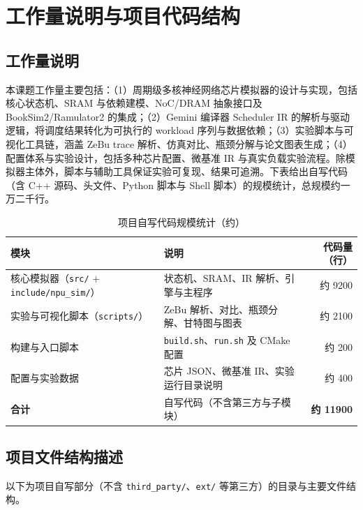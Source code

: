 \section{工作量说明与项目代码结构}
\label{app:workload_and_structure}

\subsection{工作量说明}

本课题工作量主要包括：（1）周期级多核神经网络芯片模拟器的设计与实现，包括核心状态机、SRAM 与依赖建模、NoC/DRAM 抽象接口及 BookSim2/Ramulator2 的集成；（2）Gemini 编译器 Scheduler IR 的解析与驱动逻辑，将调度结果转化为可执行的 workload 序列与数据依赖；（3）实验脚本与可视化工具链，涵盖 ZeBu trace 解析、仿真对比、瓶颈分解与论文图表生成；（4）配置体系与实验设计，包括多种芯片配置、微基准 IR 与真实负载实验流程。除模拟器主体外，脚本与辅助工具保证实验可复现、结果可追溯。下表给出自写代码（含 C++ 源码、头文件、Python 脚本与 Shell 脚本）的规模统计，总规模约一万二千行。

\begin{table}[H]
  \centering
  \caption{项目自写代码规模统计（约）}
  \label{tab:app:code_stats}
  {\small
  \begin{tabular}{llr}
    \toprule
    \textbf{模块} & \textbf{说明} & \textbf{代码量（行）} \\
    \midrule
    核心模拟器（\texttt{src/} + \texttt{include/npu\_sim/}） & 状态机、SRAM、IR 解析、引擎与主程序 & 约 9200 \\
    实验与可视化脚本（\texttt{scripts/}） & ZeBu 解析、对比、瓶颈分解、甘特图与图表 & 约 2100 \\
    构建与入口脚本 & \texttt{build.sh}、\texttt{run.sh} 及 CMake 配置 & 约 200 \\
    配置与实验数据 & 芯片 JSON、微基准 IR、实验运行目录说明 & 约 400 \\
    \midrule
    \textbf{合计} & 自写代码（不含第三方与子模块） & \textbf{约 11900} \\
    \bottomrule
  \end{tabular}
  }
\end{table}

\subsection{项目文件结构描述}

以下为项目自写部分（不含 \texttt{third\_party/}、\texttt{ext/} 等第三方）的目录与主要文件结构。

